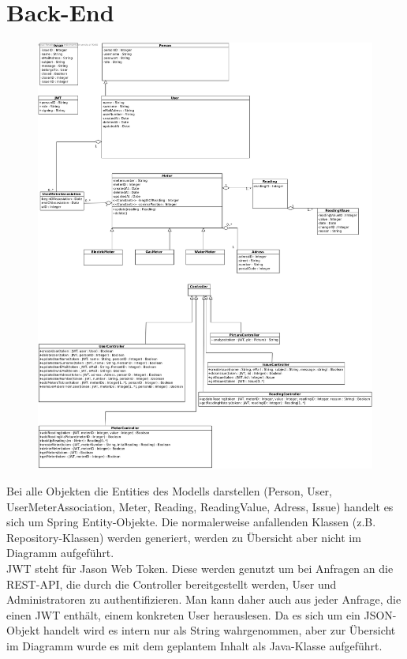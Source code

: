 \section{Back-End}
\begin{figure}[H]
\includegraphics[width=15cm]{img/diagrams/backend-class-diagram}\\
\end{figure}
\newpage
Bei alle Objekten die Entities des Modells darstellen (Person, User, UserMeterAssociation, Meter, Reading, ReadingValue, Adress, Issue) handelt es sich um Spring Entity-Objekte.
Die normalerweise anfallenden Klassen (z.B. Repository-Klassen) werden generiert, werden zu Übersicht aber nicht im Diagramm aufgeführt.\\
JWT steht für Jason Web Token. 
Diese werden genutzt um bei Anfragen an die REST-API, die durch die Controller bereitgestellt werden, User und Administratoren zu authentifizieren.
Man kann daher auch aus jeder Anfrage, die einen JWT enthält, einem konkreten User herauslesen. 
Da es sich um ein JSON-Objekt handelt wird es intern nur als String wahrgenommen, aber zur Übersicht im Diagramm wurde es mit dem geplantem Inhalt als Java-Klasse aufgeführt.\\
